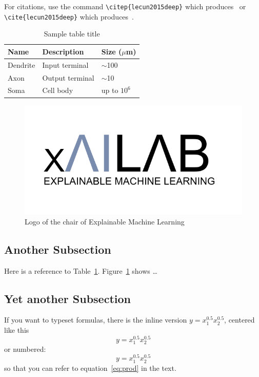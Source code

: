 

    For citations, use the command \verb+\citep{lecun2015deep}+ which produces~\citep{lecun2015deep} or \verb+\cite{lecun2015deep}+ which produces~\cite{lecun2015deep}.
    
    
    
    \begin{table}[ht]
        \caption{Sample table title}
        \centering
        \begin{tabular}{lll}
            \hline
            Name     & Description     & Size ($\mu$m) \\
            \hline
            Dendrite & Input terminal  & $\sim$100     \\
            Axon     & Output terminal & $\sim$10      \\
            Soma     & Cell body       & up to $10^6$  \\
            \hline
        \end{tabular}
       \label{t1:sample}
    \end{table}
    
    
    \begin{figure}[ht]
      \centering
       \includegraphics[width=.5\textwidth]{xaiLogo.png}
      \caption{Logo of the chair of Explainable Machine Learning}   
      \label{fig:xai_logo}
    \end{figure}  
    
    \subsection{Another Subsection}
    \label{subsec:another}
    Here is a reference to Table~\ref{t1:sample}. Figure~\ref{fig:xai_logo} shows \ldots
    
    
    
    
    
    \subsection{Yet another Subsection}
    \label{subsec:yetanother}
    
    If you want to typeset formulas, there is the inline version $ y = x_1^{0.5} x_2^{0.5}$, centered like this
    \[
    y = x_1^{0.5} x_2^{0.5}
    \]
    or numbered:
    \begin{equation}\label{eq:prod}
    y = x_1^{0.5} x_2^{0.5}	
    \end{equation}
    so that you can refer to equation~\ref{eq:prod} in the text.
    
